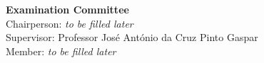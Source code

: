 \vfill

\begin{center}
{\myfontB \bf Examination Committee} \\
$ $ \\
\myfontC
 { Chairperson: \emph{to be filled later} } \\
 { Supervisor: Professor Jos\'e Ant\'onio da Cruz Pinto Gaspar} \\
 { Member: \emph{to be filled later} } \\
\end{center}

\singlespace


\vfill

\onehalfspace \centerline{\myfontB \bf \monthname \, \the\year} \singlespace

\pagebreak \thispagestyle{empty} $ $ \pagebreak

